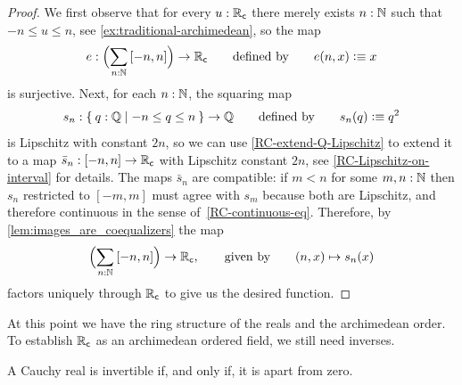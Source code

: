 \begin{proof}
  We first observe that for every $u : \mathbb{R}_\mathsf{c}$ there merely exists $n : \mathbb{N}$ such that $-n
  \leq u \leq n$, see \cref{ex:traditional-archimedean}, so the map
  \begin{equation*}
    e : \Parens{\sm{n : \N} [-n, n]} \to \RC
    \qquad\text{defined by}\qquad
    e(n, x) \defeq x
  \end{equation*}
  is surjective. Next, for each $n : \mathbb{N}$, the squaring map
  \begin{equation*}
    s_n : \setof{ q : \Q | -n \leq q \leq n } \to \Q
    \qquad\text{defined by}\qquad
    s_n(q) \defeq q^2
  \end{equation*}
  is Lipschitz with constant $2 n$, so we can use \cref{RC-extend-Q-Lipschitz} to
  extend it to a map $\bar{s}_n : [-n, n] \to \mathbb{R}_\mathsf{c}$ with Lipschitz constant $2 n$, see
  \cref{RC-Lipschitz-on-interval} for details. The maps $\bar{s}_n$ are compatible: if
  $m < n$ for some $m, n : \mathbb{N}$ then $s_n$ restricted to $[-m, m]$ must agree with $s_m$
  because both are Lipschitz, and therefore continuous in the sense
  of~\cref{RC-continuous-eq}. Therefore, by \cref{lem:images_are_coequalizers} the map
  \begin{equation*}
    \Parens{\sm{n : \N} [-n, n]} \to \RC,
    \qquad\text{given by}\qquad
    (n, x) \mapsto s_n(x)
  \end{equation*}
  factors uniquely through $\mathbb{R}_\mathsf{c}$ to give us the desired function.
\end{proof}

At this point we have the ring structure of the reals and the archimedean order. To
establish $\mathbb{R}_\mathsf{c}$ as an archimedean ordered field, we still need inverses.

\begin{thm}
  A Cauchy real is invertible if, and only if, it is apart from zero.
\end{thm}


